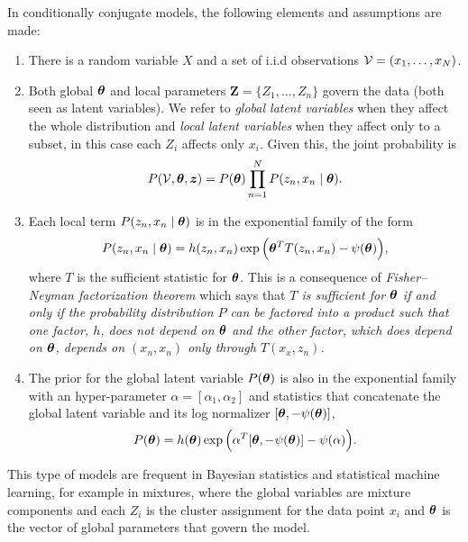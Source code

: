  In conditionally conjugate models, the following elements and assumptions are made:
\begin{enumerate}\itemsep0.5em
  \item There is a random variable \(X\) and a set of i.i.d observations \(\mathcal{V} = (x_{1}, \dots, x_{N})\).
  \item Both global \(\bm{\theta}\) and local parameters \(\bm{Z} = \{Z_{1}, \dots, Z_{n}\}\) govern the data (both seen as latent variables). We refer to \emph{global latent variables} when they affect the whole distribution and \emph{local latent variables} when they affect only to a subset, in this case each \(Z_{i}\) affects only \(x_{i}\). Given this, the joint probability is
    \[
    P(\mathcal{V}, \bm{\theta}, \bm{z}) = P(\bm{\theta})\prod_{n=1}^{N}P(z_{n}, x_{n} \mid \bm{\theta}).
    \]
  \item Each local term \(P(z_{n},x_{n} \mid \bm{\theta})\) is in the exponential family of the form
    \[
    P(z_{n},x_{n} \mid \bm{\theta}) = h(z_{n}, x_{n}) \exp \Big( \bm{\theta}^{T} T(z_{n}, x_{n}) - \psi(\bm{\theta}) \Big),
    \]
    where \(T\) is the sufficient statistic for \(\bm{\theta}\). This is a consequence of \emph{Fisher–Neyman factorization theorem} which says that \textit{\(T\) is sufficient for \(\bm{\theta}\)  if and only if the probability distribution \(P\)  can be factored into a product such that one factor, \(h\), does not depend on \(\bm{\theta}\)  and the other factor, which does depend on \(\bm{\theta}\), depends on \((x_{n}, x_{n})\)  only through \(T(x_{x}, z_{n})\).}
  \item The prior for the global latent variable \(P(\bm{\theta})\) is also in the exponential family with an hyper-parameter \(\alpha = [\alpha_{1}, \alpha_{2}]\) and statistics that concatenate the global latent variable and its log normalizer \([\bm{\theta}, -\psi(\bm{\theta})]\),
    \[
    P(\bm{\theta}) = h(\bm{\theta}) \exp \Big( \alpha^{T}[\bm{\theta}, -\psi(\bm{\theta})] - \psi(\alpha)\Big).
    \]
\end{enumerate}

\begin{remark}
  This type of models are frequent in Bayesian statistics and statistical machine learning, for example in mixtures, where the global variables are mixture components and each \(Z_{i}\) is the cluster assignment for the data point \(x_{i}\) and \(\bm{\theta}\) is the vector of global parameters that govern the model.
\end{remark}

